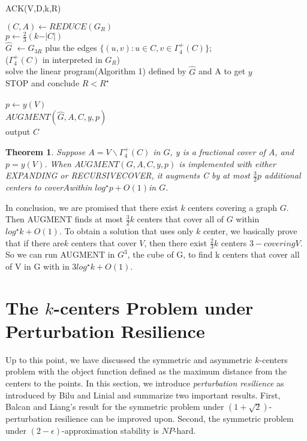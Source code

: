 \documentclass{article}
\newtheorem{theorem}{Theorem}
\begin{document}
\begin{algorithm}
\caption{ACK(V,D,k,R)}
\begin{algorithmic} 
\STATE $(C,A) \leftarrow REDUCE(G_R)$\\
\STATE $p \leftarrow \frac23(k- \vert C \vert)$\\
\STATE $\hat{G}$ $\leftarrow G_{3R}$ plus the edges $\{(u,v):u\in C, v\in  \Gamma_4^+(C)\}$;\\
\STATE ($\Gamma_4^+(C)$ in interpreted in $G_R$)\\
\STATE solve the linear program(Algorithm 1) defined by $\hat{G}$  and A to get $y$\\

        \STATE   STOP and conclude $R< R^\star$\\
\ELSE\\
        \STATE$p \leftarrow y(V)$\\
        \STATE$AUGMENT(\hat{G},A,C,y,p)$\\
\ENDIF
\STATE output $C$
\end{algorithmic}
\end{algorithm}

\begin{theorem}
Suppose $A=V\backslash \Gamma_4^+(C)$ in $G$, y is a fractional cover of $A$, and $p=y(V)$. When $AUGMENT(G,A,C,y,p)$ is implemented with either EXPANDING or RECURSIVECOVER, it augments C by at most $\frac32 p$ additional centers to cover$ A $within $log^\star p + O(1)$in $G$.
\end{theorem}

In conclusion, we are promised that there exist $k$ centers covering a graph $G$. Then AUGMENT finds at  most $\frac 32 k$ centers that cover all of $G$ within $log^\star k + O(1)$. To obtain a solution that uses only $k$ center, we basically prove that if there are$ k$ centers that cover $V$, then there exist $\frac23k$ centers $3-covering$$ V$. So we can run AUGMENT in $G^3$, the cube of G, to find k centers that cover all of V in G with in $3log^\star k + O(1)$.

\section{The $k$-centers Problem under Perturbation Resilience}

Up to this point, we have discussed the symmetric and asymmetric $k$-centers problem with the object function defined as the maximum distance from the centers to the points. In this section, we introduce \emph{perturbation resilience} as introduced by Bilu and Linial and summarize two important results. First, Balcan and Liang's result for the symmetric problem under $(1+\sqrt2)$-perturbation resilience can be improved upon. Second, the symmetric problem under $(2-\epsilon)$-approximation stability is $NP$-hard.
\end{document}
